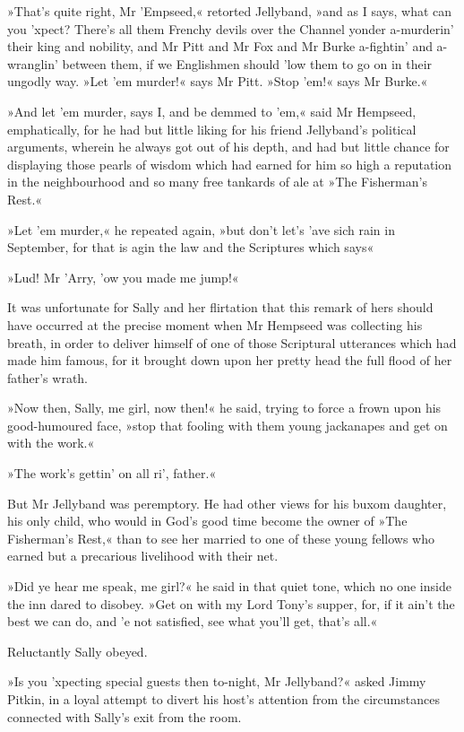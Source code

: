 »That's quite right, Mr 'Empseed,« retorted Jellyband, »and as I says, what can you 'xpect? There's all them Frenchy devils over the Channel yonder a-murderin' their king and nobility, and Mr Pitt and Mr Fox and Mr Burke a-fightin' and a-wranglin' between them, if we Englishmen should 'low them to go on in their ungodly way. »Let 'em murder!« says Mr Pitt. »Stop 'em!« says Mr Burke.«

»And let 'em murder, says I, and be demmed to 'em,« said Mr Hempseed, emphatically, for he had but little liking for his friend Jellyband's political arguments, wherein he always got out of his depth, and had but little chance for displaying those pearls of wisdom which had earned for him so high a reputation in the neighbourhood and so many free tankards of ale at »The Fisherman's Rest.«

»Let 'em murder,« he repeated again, »but don't let's 'ave sich rain in September, for that is agin the law and the Scriptures which says\longdash«

»Lud! Mr 'Arry, 'ow you made me jump!«

It was unfortunate for Sally and her flirtation that this remark of hers should have occurred at the precise moment when Mr Hempseed was collecting his breath, in order to deliver himself of one of those Scriptural utterances which had made him famous, for it brought down upon her pretty head the full flood of her father's wrath.

»Now then, Sally, me girl, now then!« he said, trying to force a frown upon his good-humoured face, »stop that fooling with them young jackanapes and get on with the work.«

»The work's gettin' on all ri', father.«

But Mr Jellyband was peremptory. He had other views for his buxom daughter, his only child, who would in God's good time become the owner of »The Fisherman's Rest,« than to see her married to one of these young fellows who earned but a precarious livelihood with their net.

»Did ye hear me speak, me girl?« he said in that quiet tone, which no one inside the inn dared to disobey. »Get on with my Lord Tony's supper, for, if it ain't the best we can do, and 'e not satisfied, see what you'll get, that's all.«

Reluctantly Sally obeyed.

»Is you 'xpecting special guests then to-night, Mr Jellyband?« asked Jimmy Pitkin, in a loyal attempt to divert his host's attention from the circumstances connected with Sally's exit from the room.

